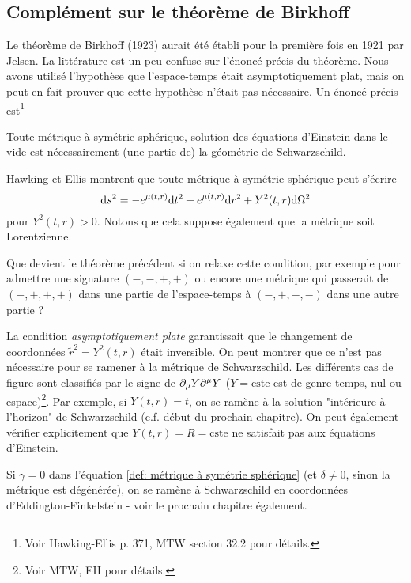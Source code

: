 \subsection{Complément sur le théorème de Birkhoff}
Le théorème de Birkhoff (1923) aurait été établi pour la première fois en 1921 par Jelsen. La littérature est un peu confuse sur l'énoncé précis du théorème. Nous avons utilisé l'hypothèse que l'espace-temps était asymptotiquement plat, mais on peut en fait prouver que cette hypothèse n'était pas nécessaire. Un énoncé précis est\footnote{Voir Hawking-Ellis p. 371, MTW section 32.2 pour détails.}
\begin{theoremframe}
    \begin{theorem}[de Birkhoff]
        Toute métrique à symétrie sphérique, solution des équations d'Einstein dans le vide est nécessairement (une partie de) la géométrie de Schwarzschild.
    \end{theorem}
\end{theoremframe}
Hawking et Ellis montrent que toute métrique à symétrie sphérique peut s'écrire
\begin{equation}
    \mathrm{d} s^2 = - e^{\mu(t,r)} \mathrm{d} t^2 + e^{\mu(t,r)} \mathrm{d} r^2 + Y^2(t,r) \mathrm{d} \Omega^2
\end{equation}
pour $Y^2(t,r) >0$. Notons que cela suppose également que la métrique soit Lorentzienne. 
\begin{exerc}
    Que devient le théorème précédent si on relaxe cette condition, par exemple pour admettre une signature $(-,-,+,+)$ ou encore une métrique qui passerait de $(-,+,+,+)$ dans une partie de l'espace-temps à $(-,+,-,-)$ dans une autre partie ?
\end{exerc}
La condition \emph{asymptotiquement plate} garantissait que le changement de coordonnées $\tilde{r}^2 = Y^2(t,r)$ était inversible. On peut montrer que ce n'est pas nécessaire pour se ramener à la métrique de Schwarzschild. Les différents cas de figure sont classifiés par le signe de $\partial_\mu Y \partial^\mu Y$ ($Y = \text{cste}$ est de genre temps, nul ou espace)\footnote{Voir MTW, EH pour détails.}.
Par exemple, si $Y(t,r) = t$, on se ramène à la solution "intérieure à l'horizon" de Schwarzschild (c.f. début du prochain chapitre). On peut également vérifier explicitement que $Y(t,r) = R = \text{cste}$ ne satisfait pas aux équations d'Einstein.
\begin{rmk}
    Si $\gamma = 0$ dans l'équation \ref{def: métrique à symétrie sphérique} (et $\delta \neq 0$, sinon la métrique est dégénérée), on se ramène à Schwarzschild en coordonnées d'Eddington-Finkelstein - voir le prochain chapitre également.
\end{rmk}

